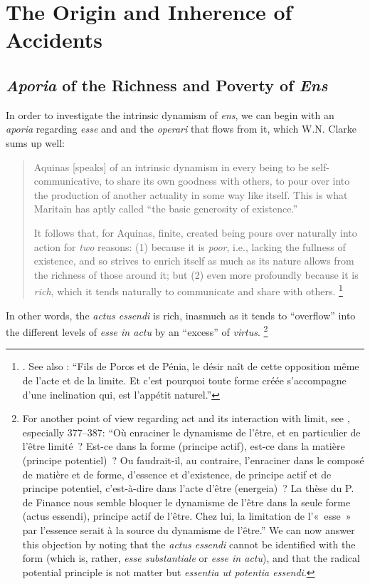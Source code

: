 \section{The Origin and Inherence of Accidents}

\subsection{\emph{Aporia} of the Richness and Poverty of \emph{Ens}}
\label{sec:aporia}

In order to investigate the intrinsic dynamism of \emph{ens}, we can begin with an \emph{aporia} regarding \emph{esse} and and the \emph{operari} that flows from it, which W.N. Clarke sums up well:
%
\begin{quotation}
Aquinas [speaks] of an intrinsic dynamism in every being to be self-communica\-tive, to share its own goodness with others, to pour over into the production of another actuality in some way like itself. This is what Maritain has aptly called “the basic generosity of existence.”

It follows that, for Aquinas, finite, created being pours over naturally into action for \emph{two} reasons: (1) because it is \emph{poor}, i.e., lacking the fullness of existence, and so strives to enrich itself as much as its nature allows from the richness of those around it; but (2) even more profoundly because it is \emph{rich}, which it tends naturally to communicate and share with others.%
%
\footnote{\Cite[605]{clarke:person-being}. See also \cite[163–164]{definance:etre-et-agir}: “Fils de Poros et de Pénia, le désir naît de cette opposition même de l’acte et de la limite. Et c’est pourquoi toute forme créée s’accompagne d’une inclination qui, est l’appétit naturel.”}
\end{quotation}
%
In other words, the \emph{actus essendi} is rich, inasmuch as it tends to “overflow” into the different levels of \emph{esse in actu} by an “excess” of \emph{virtus}.%
%
\footnote{For another point of view regarding act and its interaction with limit, see \cite{kambembo:essai}, especially 377–387: “Où enraciner le dynamisme de l’être, et en particulier de l’être limité~? Est-ce dans la forme (principe actif), est-ce dans la matière (principe potentiel)~? Ou faudrait-il, au contraire, l’enraciner dans le composé de matière et de forme, d’essence et d’existence, de principe actif et de principe potentiel, c’est-à-dire dans l’acte d’être (energeia)~? La thèse du P. de Finance nous semble bloquer le dynamisme de l’être dans la seule forme (actus essendi), principe actif de l’être. Chez lui, la limitation de l’«~esse~» par l’essence serait à la source du dynamisme de l’être.” We can now answer this objection by noting that the \emph{actus essendi} cannot be identified with the form (which is, rather, \emph{esse substantiale} or \emph{esse in actu}), and that the radical potential principle is not matter but \emph{essentia ut potentia essendi}.}
